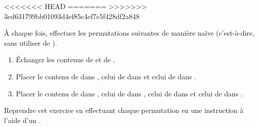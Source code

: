 <<<<<<< HEAD
=======
>>>>>>> 3ed631799bb01093d4ef85c4ef7c5f428df2a848

À chaque fois, effectuer les permutations suivantes de manière naïve (c'est-à-dire, sans utiliser de ).
\begin{enumerate}[label=\emph{\alph*)}]
  \item \'Echanger les contenus de  et de .
  \item Placer le contenu de  dans , celui de  dans  et celui de  dans .
  \item Placer le contenu de  dans , celui de  dans , celui de  dans  et celui de  dans .
\end{enumerate}
Reprendre cet exercice en effectuant chaque permutation en une instruction à l'aide d'un .